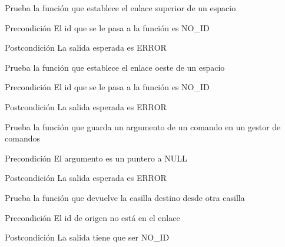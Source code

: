 \begin{DoxyRefList}
\item[\label{test__test000267}%
\hypertarget{test__test000267}{}%
Global \hyperlink{space__test_8c_a4b9cd940aa6ec095996f2051ee938070}{test3\-\_\-space\-\_\-set\-\_\-up} ()]Prueba la función que establece el enlace superior de un espacio \begin{DoxyPrecond}{Precondición}
El id que se le pasa a la función es N\-O\-\_\-\-I\-D 
\end{DoxyPrecond}
\begin{DoxyPostcond}{Postcondición}
La salida esperada es E\-R\-R\-O\-R  
\end{DoxyPostcond}

\item[\label{test__test000264}%
\hypertarget{test__test000264}{}%
Global \hyperlink{space__test_8c_a8150758940559ef958649a2fab36bee0}{test3\-\_\-space\-\_\-set\-\_\-west} ()]Prueba la función que establece el enlace oeste de un espacio \begin{DoxyPrecond}{Precondición}
El id que se le pasa a la función es N\-O\-\_\-\-I\-D 
\end{DoxyPrecond}
\begin{DoxyPostcond}{Postcondición}
La salida esperada es E\-R\-R\-O\-R  
\end{DoxyPostcond}

\item[\label{test__test000012}%
\hypertarget{test__test000012}{}%
Global \hyperlink{command__test_8c_a615277c7c276a517908a17f3dbc67539}{test4\-\_\-command\-\_\-set\-\_\-cmd\-\_\-arg} ()]Prueba la función que guarda un argumento de un comando en un gestor de comandos \begin{DoxyPrecond}{Precondición}
El argumento es un puntero a N\-U\-L\-L 
\end{DoxyPrecond}
\begin{DoxyPostcond}{Postcondición}
La salida esperada es E\-R\-R\-O\-R  
\end{DoxyPostcond}

\item[\label{test__test000157}%
\hypertarget{test__test000157}{}%
Global \hyperlink{link__test_8c_ab94678a1f130085e266294a44ddccada}{test4\-\_\-link\-\_\-get\-\_\-dest\-\_\-from} ()]Prueba la función que devuelve la casilla destino desde otra casilla \begin{DoxyPrecond}{Precondición}
El id de origen no está en el enlace 
\end{DoxyPrecond}
\begin{DoxyPostcond}{Postcondición}
La salida tiene que ser N\-O\-\_\-\-I\-D  
\end{DoxyPostcond}


\end{DoxyRefList}
